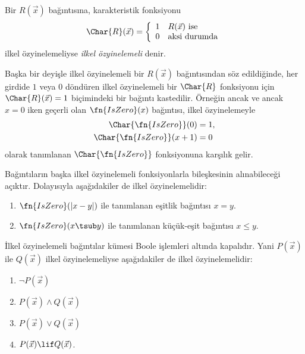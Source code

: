 \documentclass[../../../include/open-logic-section]{subfiles}
\begin{document}

\begin{defn}
Bir $R(\vec x)$ bağıntısına, karakteristik fonksiyonu
\[
\Char{R}(\vec x)=\left\{
  \begin{array}{ll}
    1 & \mbox{$R(\vec x)$ ise}\\
    0 & \mbox{aksi durumda}
  \end{array}
\right.
\]
ilkel özyinelemeliyse \emph{ilkel özyinelemeli} denir.
\end{defn}

Başka bir deyişle ilkel özyinelemeli bir $R(\vec x)$ bağıntısından söz
edildiğinde, her girdide $1$ veya $0$ döndüren ilkel özyinelemeli bir
$\Char{R}$ fonksiyonu için $\Char{R}(\vec x)=1$ biçimindeki bir bağıntı
kastedilir. Örneğin ancak ve ancak $x=0$ iken geçerli olan
$\fn{IsZero}(x)$ bağıntısı, ilkel özyinelemeyle
\begin{align*}
  \Char{\fn{IsZero}}(0) & = 1,\\
  \Char{\fn{IsZero}}(x+1) & = 0
\end{align*}
olarak tanımlanan $\Char{\fn{IsZero}}$ fonksiyonuna karşılık gelir.

Bağıntıların başka ilkel özyinelemeli fonksiyonlarla bileşkesinin
alınabileceği açıktır. Dolayısıyla aşağıdakiler de ilkel özyinelemelidir:
\begin{enumerate}
\item $\fn{IsZero}(\lvert x-y\rvert)$ ile tanımlanan eşitlik bağıntısı
  $x=y$.
\item $\fn{IsZero}(x\tsub y)$ ile tanımlanan küçük-eşit bağıntısı
  $x\leq y$.
\end{enumerate}

\begin{prop}
  İlkel özyinelemeli bağıntılar kümesi Boole işlemleri altında kapalıdır.
  Yani $P(\vec x)$ ile $Q(\vec x)$ ilkel özyinelemeliyse aşağıdakiler de
  ilkel özyinelemelidir:
  \begin{enumerate}
  \item $\lnot P(\vec x)$
  \item $P(\vec x)\land Q(\vec x)$
  \item $P(\vec x)\lor Q(\vec x)$
  \item $P(\vec x)\lif Q(\vec x)$.
  \end{enumerate}
\end{prop}
\end{document}
